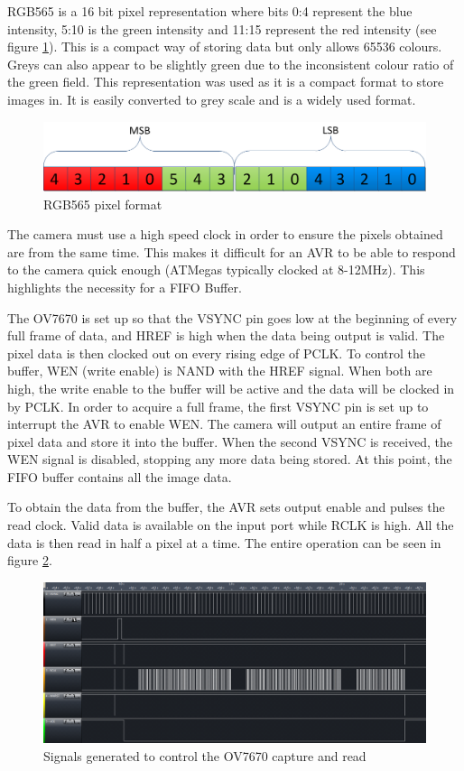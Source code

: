 RGB565 is a 16 bit pixel representation where bits 0:4 represent the blue intensity, 5:10 is the green intensity and 11:15 represent the red intensity (see figure \ref{fig:RGB565}). This is a compact way of storing data but only allows 65536 colours. Greys can also appear to be slightly green due to the inconsistent colour ratio of the green field. This representation was used as it is a compact format to store images in. It is easily converted to grey scale and is a widely used format.
\begin{figure}
\includegraphics[width = \textwidth]{./Figures/RGB565.png}
\caption{RGB565 pixel format}
\label{fig:RGB565}
\end{figure}

The camera must use a high speed clock in order to ensure the pixels obtained are from the same time. This makes it difficult for an AVR to be able to respond to the camera quick enough (ATMegas typically clocked at 8-12MHz). This highlights the necessity for a FIFO Buffer. 

The OV7670 is set up so that the VSYNC pin goes low at the beginning of every full frame of data, and HREF is high when the data being output is valid. The pixel data is then clocked out on every rising edge of PCLK. To control the buffer, WEN (write enable) is NAND with the HREF signal. When both are high, the write enable to the buffer will be active and the data will be clocked in by PCLK. In order to acquire a full frame, the first VSYNC pin is set up to interrupt the AVR to enable WEN. The camera will output an entire frame of pixel data and store it into the buffer. When the second VSYNC is received, the WEN signal is disabled, stopping any more data being stored. At this point, the FIFO buffer contains all the image data.

To obtain the data from the buffer, the AVR sets output enable and pulses the read clock. Valid data is available on the input port while RCLK is high. All the data is then read in half a pixel at a time. The entire operation can be seen in figure \ref{fig:ov_Capture}.
\begin{figure}
\includegraphics[width = \textwidth]{./Figures/ov7670_im_capture.png}
\caption{Signals generated to control the OV7670 capture and read}
\label{fig:ov_Capture}
\end{figure}


